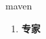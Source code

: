 
\begin{frame}
{\huge maven}
\begin{center}
\begin{enumerate}\Large
  \item \textbf{专家}
\end{enumerate}
\end{center}
\end{frame}
